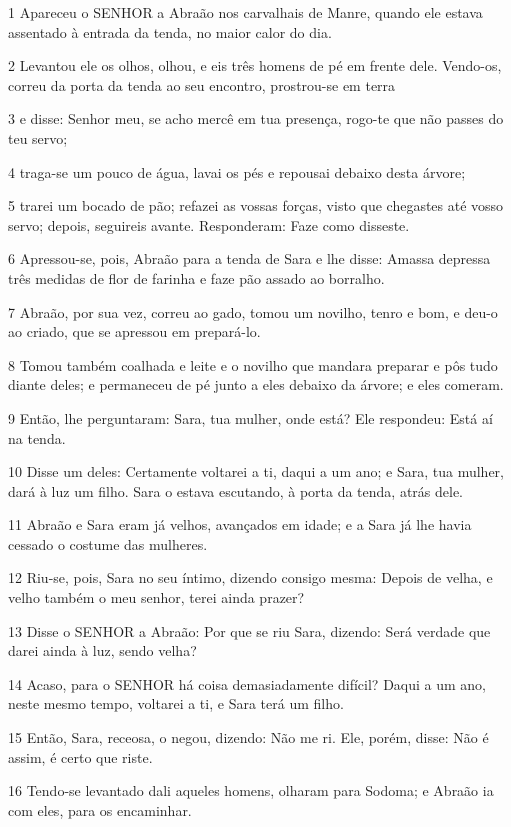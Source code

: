 \par 1 Apareceu o SENHOR a Abraão nos carvalhais de Manre, quando ele estava assentado à entrada da tenda, no maior calor do dia.
\par 2 Levantou ele os olhos, olhou, e eis três homens de pé em frente dele. Vendo-os, correu da porta da tenda ao seu encontro, prostrou-se em terra
\par 3 e disse: Senhor meu, se acho mercê em tua presença, rogo-te que não passes do teu servo;
\par 4 traga-se um pouco de água, lavai os pés e repousai debaixo desta árvore;
\par 5 trarei um bocado de pão; refazei as vossas forças, visto que chegastes até vosso servo; depois, seguireis avante. Responderam: Faze como disseste.
\par 6 Apressou-se, pois, Abraão para a tenda de Sara e lhe disse: Amassa depressa três medidas de flor de farinha e faze pão assado ao borralho.
\par 7 Abraão, por sua vez, correu ao gado, tomou um novilho, tenro e bom, e deu-o ao criado, que se apressou em prepará-lo.
\par 8 Tomou também coalhada e leite e o novilho que mandara preparar e pôs tudo diante deles; e permaneceu de pé junto a eles debaixo da árvore; e eles comeram.
\par 9 Então, lhe perguntaram: Sara, tua mulher, onde está? Ele respondeu: Está aí na tenda.
\par 10 Disse um deles: Certamente voltarei a ti, daqui a um ano; e Sara, tua mulher, dará à luz um filho. Sara o estava escutando, à porta da tenda, atrás dele.
\par 11 Abraão e Sara eram já velhos, avançados em idade; e a Sara já lhe havia cessado o costume das mulheres.
\par 12 Riu-se, pois, Sara no seu íntimo, dizendo consigo mesma: Depois de velha, e velho também o meu senhor, terei ainda prazer?
\par 13 Disse o SENHOR a Abraão: Por que se riu Sara, dizendo: Será verdade que darei ainda à luz, sendo velha?
\par 14 Acaso, para o SENHOR há coisa demasiadamente difícil? Daqui a um ano, neste mesmo tempo, voltarei a ti, e Sara terá um filho.
\par 15 Então, Sara, receosa, o negou, dizendo: Não me ri. Ele, porém, disse: Não é assim, é certo que riste.
\par 16 Tendo-se levantado dali aqueles homens, olharam para Sodoma; e Abraão ia com eles, para os encaminhar.
